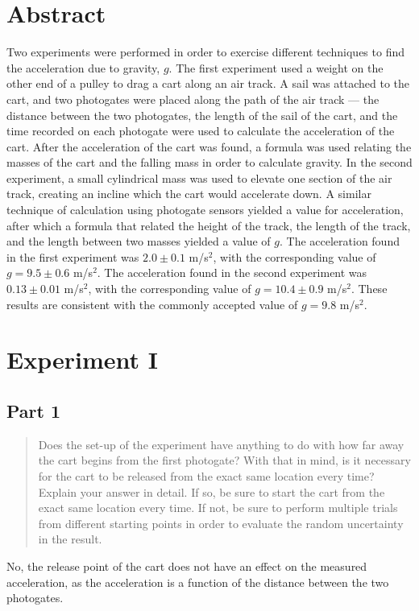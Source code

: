 \documentclass[10pt]{extarticle}
\title{}
\author{Avinash Iyer}
\date{}
\begin{document}
{
\section*{Abstract}
Two experiments were performed in order to exercise different techniques to find the acceleration due to gravity, $g$. The first experiment used a weight on the other end of a pulley to drag a cart along an air track. A sail was attached to the cart, and two photogates were placed along the path of the air track — the distance between the two photogates, the length of the sail of the cart, and the time recorded on each photogate were used to calculate the acceleration of the cart. After the acceleration of the cart was found, a formula was used relating the masses of the cart and the falling mass in order to calculate gravity. In the second experiment, a small cylindrical mass was used to elevate one section of the air track, creating an incline which the cart would accelerate down. A similar technique of calculation using photogate sensors yielded a value for acceleration, after which a formula that related the height of the track, the length of the track, and the length between two masses yielded a value of $g$. The acceleration found in the first experiment was $2.0 \pm 0.1$ m/s$^2$, with the corresponding value of $g = 9.5 \pm 0.6$ m/s$^2$. The acceleration found in the second experiment was $0.13 \pm 0.01$ m/s$^2$, with the corresponding value of $g = 10.4 \pm 0.9$ m/s$^2$. These results are consistent with the commonly accepted value of $g = 9.8$ m/s$^2$.
\section*{Experiment I}
\subsection*{Part 1}
\begin{quote}
	Does the set-up of the experiment have anything to do with how far away the cart begins from the first photogate?  With that in mind, is it necessary for the cart to be released from the exact same location every time?  Explain your answer in detail.  If so, be sure to start the cart from the exact same location every time.  If not, be sure to perform multiple trials from different starting points in order to evaluate the random uncertainty in the result.
\end{quote}		
No, the release point of the cart does not have an effect on the measured acceleration, as the acceleration is a function of the distance between the two photogates.
}
\end{document}
